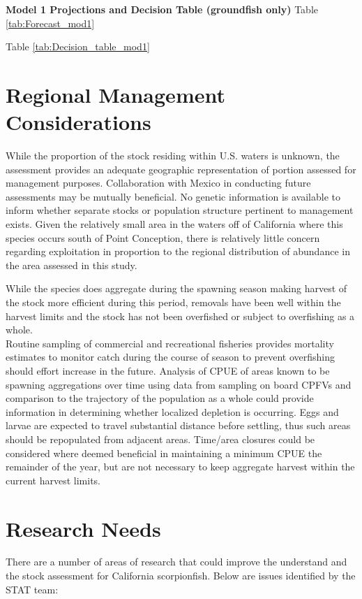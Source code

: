 \documentclass[12pt,]{article}
\begin{document}
\textbf{Model 1 Projections and Decision Table (groundfish only)} Table
\ref{tab:Forecast_mod1}

Table \ref{tab:Decision_table_mod1}

\section{Regional Management
Considerations}\label{regional-management-considerations}

While the proportion of the stock residing within U.S. waters is
unknown, the assessment provides an adequate geographic representation
of portion assessed for management purposes. Collaboration with Mexico
in conducting future assessments may be mutually beneficial. No genetic
information is available to inform whether separate stocks or population
structure pertinent to management exists. Given the relatively small
area in the waters off of California where this species occurs south of
Point Conception, there is relatively little concern regarding
exploitation in proportion to the regional distribution of abundance in
the area assessed in this study.

While the species does aggregate during the spawning season making
harvest of the stock more efficient during this period, removals have
been well within the harvest limits and the stock has not been
overfished or subject to overfishing as a whole.\\
Routine sampling of commercial and recreational fisheries provides
mortality estimates to monitor catch during the course of season to
prevent overfishing should effort increase in the future. Analysis of
CPUE of areas known to be spawning aggregations over time using data
from sampling on board CPFVs and comparison to the trajectory of the
population as a whole could provide information in determining whether
localized depletion is occurring. Eggs and larvae are expected to travel
substantial distance before settling, thus such areas should be
repopulated from adjacent areas. Time/area closures could be considered
where deemed beneficial in maintaining a minimum CPUE the remainder of
the year, but are not necessary to keep aggregate harvest within the
current harvest limits.

\section{Research Needs}\label{research-needs}

There are a number of areas of research that could improve the
understand and the stock assessment for California scorpionfish. Below
are issues identified by the STAT team:
\end{document}
